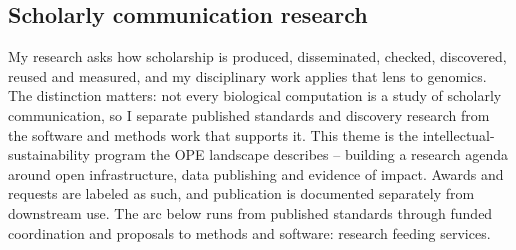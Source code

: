 \subsection{Scholarly communication research}
My research asks how scholarship is produced, disseminated, checked, discovered, reused and measured, and my disciplinary work applies that lens to genomics. The distinction matters: not every biological computation is a study of scholarly communication, so I separate published standards and discovery research from the software and methods work that supports it. This theme is the intellectual-sustainability program the OPE landscape describes -- building a research agenda around open infrastructure, data publishing and evidence of impact. Awards and requests are labeled as such, and publication is documented separately from downstream use. The arc below runs from published standards through funded coordination and proposals to methods and software: research feeding services.

